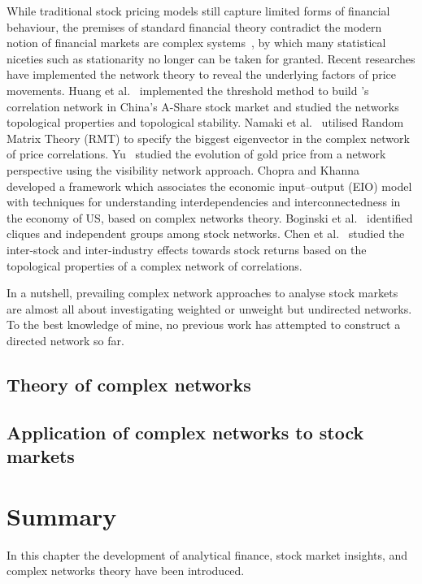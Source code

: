 While traditional stock pricing models still capture limited forms of financial behaviour, the premises of standard financial theory contradict the modern notion of financial markets are complex systems~\cite{financialcomplex}, by which many statistical niceties such as stationarity no longer can be taken for granted. Recent researches have implemented the network theory to reveal the underlying factors of price movements. Huang et al.~\cite{chinesenetwork} implemented the threshold method to build ’s correlation network in China's A-Share stock market and studied the networks topological properties and topological stability. Namaki et al.~\cite{genuine} utilised Random Matrix Theory (RMT) to specify the biggest eigenvector in the complex network of price correlations. Yu~\cite{visibility} studied the evolution of gold price from a network perspective using the visibility network approach. Chopra and Khanna~\cite{intercd} developed a framework which associates the economic input–output (EIO) model with techniques for understanding interdependencies and interconnectedness in the economy of US, based on complex networks theory. Boginski et al.~\cite{statisticalanalysis} identified cliques and independent groups among stock networks. Chen et al.~\cite{CHEN2015224} studied the inter-stock and inter-industry effects towards stock returns based on the topological properties of a complex network of correlations.

In a nutshell, prevailing complex network approaches to analyse stock markets are almost all about investigating weighted or unweight but undirected networks. To the best knowledge of mine, no previous work has attempted to construct a directed network so far.

\subsection{Theory of complex networks}

\subsection{Application of complex networks to stock markets}


\section{Summary}
In this chapter the development of analytical finance, stock market insights, and complex networks theory have been introduced.
